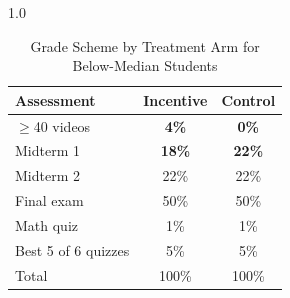 \clearpage
\begin{spacing}{1.0}
	\begin{table}
		\centering
		\caption{Grade Scheme by Treatment Arm for Below-Median Students}
		\label{tab:gradescheme}
		\begin{threeparttable}
			\begin{tabular}{lcc}
				\toprule
				Assessment          & Incentive     & Control       \\
				\midrule
				$\geq$40 videos     & \textbf{4\%}  & \textbf{0\%}  \\
				Midterm 1           & \textbf{18\%} & \textbf{22\%} \\
				Midterm 2           & 22\%          & 22\%          \\
				Final exam          & 50\%          & 50\%          \\
				Math quiz           & 1\%           & 1\%           \\
				Best 5 of 6 quizzes & 5\%           & 5\%           \\
				\midrule
				Total               & 100\%         & 100\%         \\
				\bottomrule
			\end{tabular}
		\end{threeparttable}
	\end{table}
\end{spacing}

\clearpage


\clearpage


\clearpage


\clearpage


\clearpage


\clearpage


\clearpage



